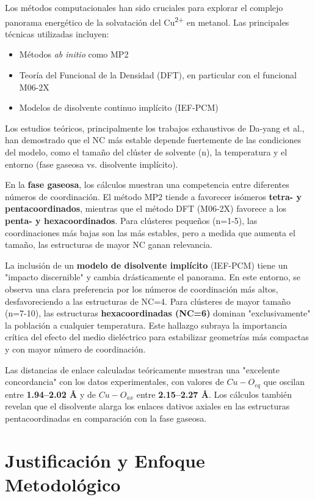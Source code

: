 Los métodos computacionales han sido cruciales para explorar el complejo panorama energético de la solvatación del Cu\textsuperscript{2+} en metanol. Las principales técnicas utilizadas incluyen:
\begin{itemize}
    \item Métodos \textit{ab initio} como MP2
    \item Teoría del Funcional de la Densidad (DFT), en particular con el funcional M06-2X
    \item Modelos de disolvente continuo implícito (IEF-PCM)
\end{itemize}

Los estudios teóricos, principalmente los trabajos exhaustivos de Da-yang et al., han demostrado que el NC más estable depende fuertemente de las condiciones del modelo, como el tamaño del clúster de solvente (n), la temperatura y el entorno (fase gaseosa vs. disolvente implícito).

En la \textbf{fase gaseosa}, los cálculos muestran una competencia entre diferentes números de coordinación. El método MP2 tiende a favorecer isómeros \textbf{tetra- y pentacoordinados}, mientras que el método DFT (M06-2X) favorece a los \textbf{penta- y hexacoordinados}. Para clústeres pequeños (n=1-5), las coordinaciones más bajas son las más estables, pero a medida que aumenta el tamaño, las estructuras de mayor NC ganan relevancia.

La inclusión de un \textbf{modelo de disolvente implícito} (IEF-PCM) tiene un "impacto discernible" y cambia drásticamente el panorama. En este entorno, se observa una clara preferencia por los números de coordinación más altos, desfavoreciendo a las estructuras de NC=4. Para clústeres de mayor tamaño (n=7-10), las estructuras \textbf{hexacoordinadas (NC=6)} dominan "exclusivamente" la población a cualquier temperatura. Este hallazgo subraya la importancia crítica del efecto del medio dieléctrico para estabilizar geometrías más compactas y con mayor número de coordinación.

Las distancias de enlace calculadas teóricamente muestran una "excelente concordancia" con los datos experimentales, con valores de $Cu-O_{eq}$ que oscilan entre \textbf{1.94--2.02 \AA} y de $Cu-O_{ax}$ entre \textbf{2.15--2.27 \AA}. Los cálculos también revelan que el disolvente alarga los enlaces dativos axiales en las estructuras pentacoordinadas en comparación con la fase gaseosa.



\section{Justificación y Enfoque Metodológico}

